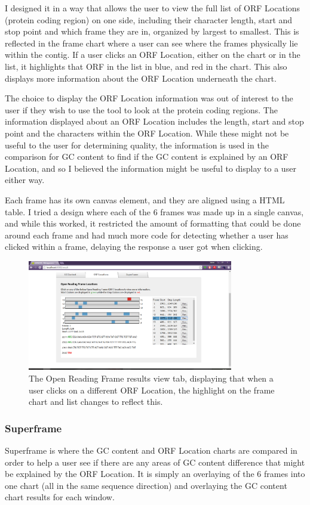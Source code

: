I designed it in a way that allows the user to view the full list of ORF Locations (protein coding region) on one side, including their character length, start and stop point and which frame they are in, organized by largest to smallest. This is reflected in the frame chart where a user can see where the frames physically lie within the contig. If a user clicks an ORF Location, either on the chart or in the list, it highlights that ORF in the list in blue, and red in the chart. This also displays more information about the ORF Location underneath the chart.

The choice to display the ORF Location information was out of interest to the user if they wish to use the tool to look at the protein coding regions. The information displayed about an ORF Location includes the length, start and stop point and the characters within the ORF Location. While these might not be useful to the user for determining quality, the information is used in the comparison for GC content to find if the GC content is explained by an ORF Location, and so I believed the information might be useful to display to a user either way.

Each frame has its own canvas element, and they are aligned using a HTML table. I tried a design where each of the 6 frames was made up in a single canvas, and while this worked, it restricted the amount of formatting that could be done around each frame and had much more code for detecting whether a user has clicked within a frame, delaying the response a user got when clicking.

\begin{figure}[H]
	\centering
\includegraphics[width=0.8\textwidth]{images/ui7}
\caption{The Open Reading Frame results view tab, displaying that when a user clicks on a different ORF Location, the highlight on the frame chart and list changes to reflect this.}
\end{figure}

\subsubsection{Superframe}
Superframe is where the GC content and ORF Location charts are compared in order to help a user see if there are any areas of GC content difference that might be explained by the ORF Location. It is simply an overlaying of the 6 frames into one chart (all in the same sequence direction) and overlaying the GC content chart results for each window.

